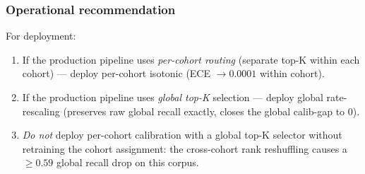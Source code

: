 \subsubsection{Operational recommendation}

For deployment:
\begin{enumerate}
\item If the production pipeline uses \emph{per-cohort routing} (separate
      top-K within each cohort) --- deploy per-cohort isotonic (ECE
      $\to 0.0001$ within cohort).
\item If the production pipeline uses \emph{global top-K} selection ---
      deploy global rate-rescaling (preserves raw global recall exactly,
      closes the global calib-gap to 0).
\item \emph{Do not} deploy per-cohort calibration with a global top-K
      selector without retraining the cohort assignment: the cross-cohort
      rank reshuffling causes a $\geq 0.59$ global recall drop on this
      corpus.
\end{enumerate}
